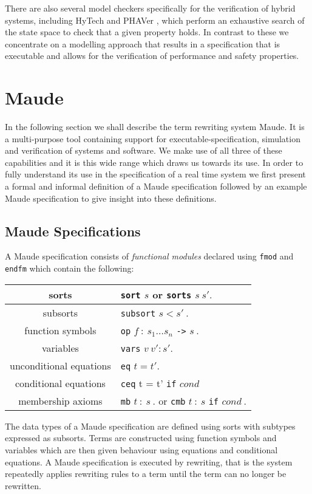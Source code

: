 %
There are also several model checkers specifically for the verification of hybrid systems, including HyTech \cite{AR96} and PHAVer \cite{GF05}, which perform an exhaustive search of the state space to check that a given property holds. In contrast to these we concentrate on a modelling approach that results in a specification that is executable and allows for the verification of performance and safety properties.
%
\section{Maude}
In the following section we shall describe the term rewriting system Maude. It is a multi-purpose tool containing support for executable-specification, simulation and verification of systems and software. We make use of all three of these capabilities and it is this wide range which draws us towards its use. In order to fully understand its use in the specification of a real time system we first present a formal and informal definition of a Maude specification followed by an example Maude specification to give insight into these definitions.
\subsection{Maude Specifications}
A Maude specification consists of \emph{functional modules} declared using \texttt{fmod} and \texttt{endfm} which contain the following:
\medskip
\begin{center}
\begin{tabular}{| c | l |}
\hline
sorts    & \texttt{sort} $s$ or \texttt{sorts}  $s \ s' .$ \\ \hline
subsorts  & \texttt{subsort} $s < s' \ .$ \\ \hline
function symbols  & \texttt{op} $f \ :  \ s_1 \ldots s_n$ \texttt{->} $s \ .$ \\ \hline
variables  & \texttt{vars} $v \ v' : s' .$\\ \hline
unconditional equations  &\texttt{eq} $t = t' .$\\ \hline
conditional equations & \texttt{ceq} t = t' \texttt{if} $cond$ \\ \hline
membership axioms & \texttt{mb} $t \ : \ s \ .$ or \texttt{cmb} $t  \ : \ s$ \texttt{if} $cond \ .$  \\ \hline
\end{tabular}
\end{center}
\medskip
The data types of a Maude specification are defined using sorts with subtypes expressed as subsorts. Terms are constructed using function symbols and variables which are then  given behaviour using equations and conditional equations.  A Maude specification is executed by rewriting, that is the system repeatedly applies rewriting rules to a term until the term can no longer be rewritten.

